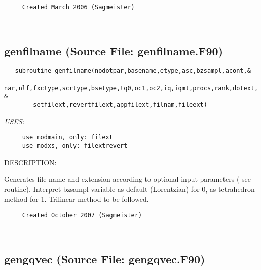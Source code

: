 \documentclass[11pt]{article}
\begin{document}
\begin{verbatim}     Created March 2006 (Sagmeister)\end{verbatim}








 
 
\mbox{}\hrulefill\ 
 
\subsection{genfilname (Source File: genfilname.F90)}


\begin{verbatim}   subroutine genfilname(nodotpar,basename,etype,asc,bzsampl,acont,&
        nar,nlf,fxctype,scrtype,bsetype,tq0,oc1,oc2,iq,iqmt,procs,rank,dotext, &
        setfilext,revertfilext,appfilext,filnam,fileext)\end{verbatim}{\em USES:}
\begin{verbatim}     use modmain, only: filext
     use modxs, only: filextrevert\end{verbatim}
{\sf DESCRIPTION:\\ }


     Generates file name and extension according to optional input parameters (
     see routine).
     Interpret bzsampl variable as default (Lorentzian) for 0, as
     tetrahedron method for 1. Trilinear method to be followed.
  
\begin{verbatim}     Created October 2007 (Sagmeister)\end{verbatim}


 
 
\mbox{}\hrulefill\ 
 
\subsection{gengqvec (Source File: gengqvec.F90)}
\end{document}
